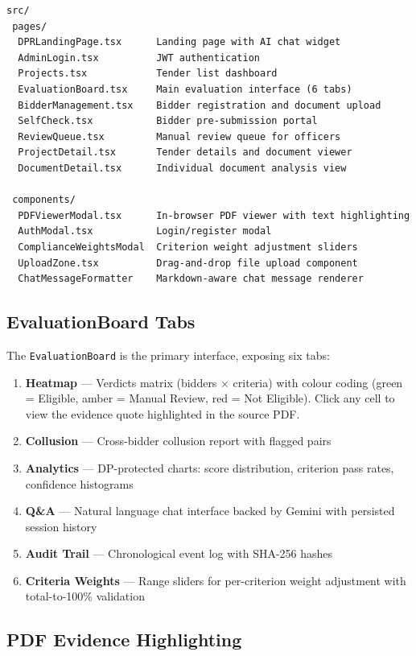 \documentclass[12pt,a4paper]{article}
\begin{document}
\begin{verbatim}
src/
 pages/
  DPRLandingPage.tsx      Landing page with AI chat widget
  AdminLogin.tsx          JWT authentication
  Projects.tsx            Tender list dashboard
  EvaluationBoard.tsx     Main evaluation interface (6 tabs)
  BidderManagement.tsx    Bidder registration and document upload
  SelfCheck.tsx           Bidder pre-submission portal
  ReviewQueue.tsx         Manual review queue for officers
  ProjectDetail.tsx       Tender details and document viewer
  DocumentDetail.tsx      Individual document analysis view

 components/
  PDFViewerModal.tsx      In-browser PDF viewer with text highlighting
  AuthModal.tsx           Login/register modal
  ComplianceWeightsModal  Criterion weight adjustment sliders
  UploadZone.tsx          Drag-and-drop file upload component
  ChatMessageFormatter    Markdown-aware chat message renderer
\end{verbatim}

\subsection{EvaluationBoard Tabs}

The \texttt{EvaluationBoard} is the primary interface, exposing six tabs:

\begin{enumerate}
\item \textbf{Heatmap} — Verdicts matrix (bidders × criteria) with colour coding
    (\textcolor{praharigreen}{green} = Eligible,
     \textcolor{prahariyellow}{amber} = Manual Review,
     \textcolor{praharired}{red} = Not Eligible). Click any cell to view
    the evidence quote highlighted in the source PDF.
\item \textbf{Collusion} — Cross-bidder collusion report with flagged pairs
\item \textbf{Analytics} — DP-protected charts: score distribution, criterion
    pass rates, confidence histograms
\item \textbf{Q\&A} — Natural language chat interface backed by Gemini with
    persisted session history
\item \textbf{Audit Trail} — Chronological event log with SHA-256 hashes
\item \textbf{Criteria Weights} — Range sliders for per-criterion weight
    adjustment with total-to-100\% validation
\end{enumerate}

\subsection{PDF Evidence Highlighting}
\end{document}
